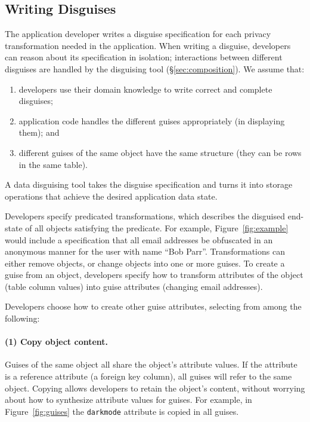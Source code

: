 \subsection{Writing Disguises}
\label{sec:disguises}
The application developer writes a disguise specification for each privacy transformation needed
in the application.
%
When writing a disguise, developers can reason about its
specification in isolation; interactions between different disguises are handled by the disguising
tool (\S\ref{sec:composition}).
%
We assume that:
\begin{enumerate}[nosep]
  \item developers use their domain knowledge to write correct and complete disguises;
  \item application code handles the different guises appropriately (\eg in
    displaying them); and
  \item different guises of the same object have the same structure (\eg they can be
    rows in the same table).
\end{enumerate}
%
A data disguising tool takes the disguise specification and turns it into storage operations that
achieve the desired application data state.

Developers specify predicated transformations, which describes the disguised end-state of all
objects satisfying the predicate. For
example, Figure~\ref{fig:example} would include a specification that all email addresses be obfuscated in an anonymous manner for the user with name ``Bob Parr''.
%
Transformations can either remove objects, or change objects into one or more guises.
To create a guise from an object, developers specify how to transform attributes of the
object (\eg table column values) into guise attributes (\eg changing email addresses).

\iffalse
Developers choose how to create other guise attributes, selecting from among the following:
%
\paragraph{(1) Copy object content.}
%
Guises of the same object all share the object's attribute values.
%
If the attribute is a reference attribute (\eg a foreign key column), all guises will refer to the same object.
%
%
Copying allows developers to retain the object's content, without worrying about how to
synthesize attribute values for guises.
%
For example, in Figure~\ref{fig:guises} the \texttt{darkmode} attribute is copied in
all guises.

